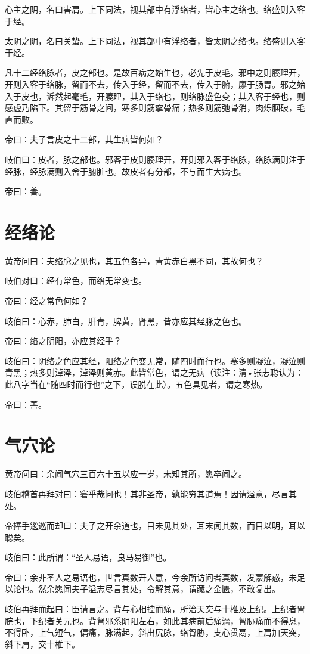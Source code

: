 \documentclass{article}%
\begin{document}
心主之阴，名曰害肩。上下同法，视其部中有浮络者，皆心主之络也。络盛则入客于经。

太阴之阴，名曰关蛰。上下同法，视其部中有浮络者，皆太阴之络也。络盛则入客于经。

凡十二经络脉者，皮之部也。是故百病之始生也，必先于皮毛。邪中之则腠理开，开则入客于络脉，留而不去，传入于经，留而不去，传入于腑，廪于肠胃。邪之始入于皮也，泝然起毫毛，开腠理，其入于络也，则络脉盛色变；其入客于经也，则感虚乃陷下。其留于筋骨之间，寒多则筋挛骨痛；热多则筋弛骨消，肉烁䐃破，毛直而败。

帝曰：夫子言皮之十二部，其生病皆何如？

岐伯曰：皮者，脉之部也。邪客于皮则腠理开，开则邪入客于络脉，络脉满则注于经脉，经脉满则入舍于腑脏也。故皮者有分部，不与而生大病也。

帝曰：善。
\section{经络论}
黄帝问曰：夫络脉之见也，其五色各异，青黄赤白黑不同，其故何也？

岐伯对曰：经有常色，而络无常变也。

帝曰：经之常色何如？

岐伯曰：心赤，肺白，肝青，脾黄，肾黑，皆亦应其经脉之色也。

帝曰：络之阴阳，亦应其经乎？

岐伯曰：阴络之色应其经，阳络之色变无常，随四时而行也。寒多则凝泣，凝泣则青黑；热多则淖泽，淖泽则黄赤。此皆常色，谓之无病（读注：清•张志聪认为：此八字当在“随四时而行也”之下，误脱在此）。五色具见者，谓之寒热。

帝曰：善。
\section{气穴论}
黄帝问曰：余闻气穴三百六十五以应一岁，未知其所，愿卒闻之。

岐伯稽首再拜对曰：窘乎哉问也！其非圣帝，孰能穷其道焉！因请溢意，尽言其处。

帝捧手逡巡而却曰：夫子之开余道也，目未见其处，耳末闻其数，而目以明，耳以聪矣。

岐伯曰：此所谓：“圣人易语，良马易御”也。

帝曰：余非圣人之易语也，世言真数开人意，今余所访问者真数，发蒙解惑，未足以论也。然余愿闻夫子溢志尽言其处，令解其意，请藏之金匮，不敢复出。

岐伯再拜而起曰：臣请言之。背与心相控而痛，所治天突与十椎及上纪。上纪者胃脘也，下纪者关元也。背胷邪系阴阳左右，如此其病前后痛濇，胷胁痛而不得息，不得卧，上气短气，偏痛，脉满起，斜出尻脉，络胷胁，支心贯鬲，上肩加天突，斜下肩，交十椎下。
\end{document}
